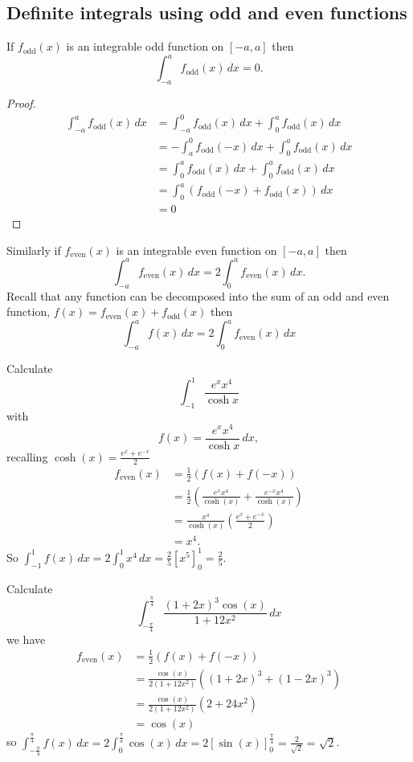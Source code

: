 \documentclass[10pt, a4paper]{article}
\begin{document}
\subsection{Definite integrals using odd and even functions}
If $f_{\text{odd}}(x)$ is an integrable odd function on $[-a, a]$ then
\[
\int_{-a}^af_{\text{odd}}(x)\,dx = 0.
\]
\begin{proof}
    \begin{align*}
        \int_{-a}^af_{\text{odd}}(x)\,dx &= \int_{-a}^0f_{\text{odd}}(x)\,dx + \int_0^af_{\text{odd}}(x)\,dx \\
        &= -\int_a^0f_{\text{odd}}(-x)\,dx + \int_0^af_{\text{odd}}(x)\,dx \\
        &= \int_0^af_{\text{odd}}(x)\,dx + \int_0^af_{\text{odd}}(x)\,dx \\
        &= \int_0^a(f_{\text{odd}}(-x) + f_{\text{odd}}(x))\,dx \\
        &= 0
    \end{align*}
\end{proof}
Similarly if $f_{\text{even}}(x)$ is an integrable even function on $[-a, a]$ then
\[
\int_{-a}^af_{\text{even}}(x)\,dx = 2\int_0^af_{\text{even}}(x)\,dx.
\]
Recall that any function can be decomposed into the sum of an odd and even function,
$f(x) = f_{\text{even}}(x) + f_{\text{odd}}(x)$ then
\[
\int_{-a}^{a}f(x)\,dx = 2\int_0^af_{\text{even}}(x)\,dx
\]
\begin{example}
    Calculate
    \[
    \int_{-1}^{1}\frac{e ^ x x ^ 4}{\cosh x}
    \]
    with
    \[
    f(x) = \frac{e ^ x x ^ 4}{\cosh x}\,dx,
    \]
    recalling $\cosh(x) = \frac{e ^ x + e ^ {-x}}{2}$
    \begin{align*}
        f_{\text{even}}(x) &= \frac{1}{2}(f(x) + f(-x)) \\
        &= \frac{1}{2}\left(\frac{e ^ x x ^ 4}{\cosh(x)} + \frac{e ^ {-x} x ^ 4}{\cosh(x)}\right) \\
        &= \frac{x ^ 4}{\cosh(x)}\left(\frac{e ^ x + e ^ {-x}}{2}\right) \\
        &= x ^ 4.
    \end{align*}
    So $\int_{-1}^{1}f(x)\,dx = 2\int_0^1x ^ 4\,dx = \frac{2}{5}\left[x ^ 5\right]_0^1 = \frac{2}{5}$.
\end{example}

\begin{example}
    Calculate
    \[
    \int_{-\frac{\pi}{4}}^{\frac{\pi}{4}}\frac{(1 + 2x) ^ 3\cos(x)}{1 +  12x ^ 2}\,dx
    \]
    we have
    \begin{align*}
        f_{\text{even}}(x) &= \frac{1}{2}\left(f(x) + f(-x)\right) \\
        &= \frac{\cos(x)}{2(1 + 12x ^ 2)}((1 + 2x) ^ 3 + (1 - 2x) ^ 3) \\
        &= \frac{\cos(x)}{2(1 + 12x ^ 2)}(2 + 24x ^ 2) \\
        &= \cos(x)
    \end{align*}
    so $\displaystyle\int_{-\frac{\pi}{4}}^{\frac{\pi}{4}}f(x)\,dx = 2\int_0^{\frac{\pi}{4}}\cos(x)\,dx = 2\left[\sin(x)\right]_0^{\frac{\pi}{4}} = \frac{2}{\sqrt{2}} = \sqrt{2}$.
\end{example}
\end{document}

